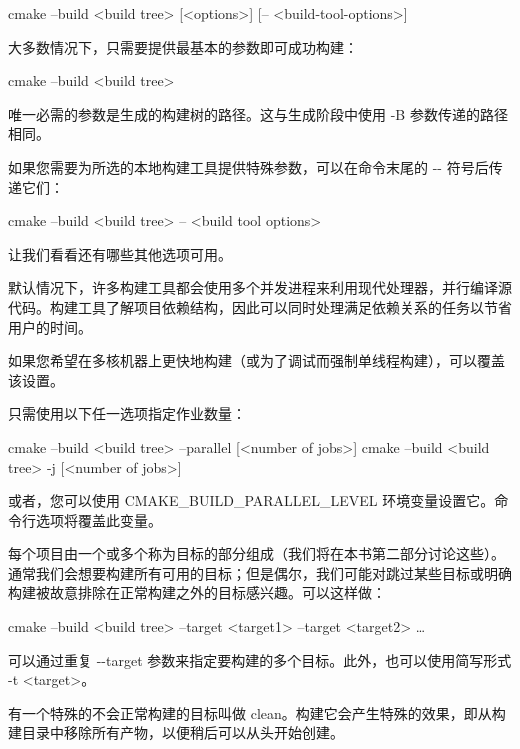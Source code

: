 \begin{shell}
cmake --build <build tree> [<options>] [-- <build-tool-options>]
\end{shell}

大多数情况下，只需要提供最基本的参数即可成功构建：

\begin{shell}
cmake --build <build tree>
\end{shell}

唯一必需的参数是生成的构建树的路径。这与生成阶段中使用 -B 参数传递的路径相同。

如果您需要为所选的本地构建工具提供特殊参数，可以在命令末尾的 -{}- 符号后传递它们：

\begin{shell}
cmake --build <build tree> -- <build tool options>
\end{shell}

让我们看看还有哪些其他选项可用。


默认情况下，许多构建工具都会使用多个并发进程来利用现代处理器，并行编译源代码。构建工具了解项目依赖结构，因此可以同时处理满足依赖关系的任务以节省用户的时间。

如果您希望在多核机器上更快地构建（或为了调试而强制单线程构建），可以覆盖该设置。

只需使用以下任一选项指定作业数量：

\begin{shell}
cmake --build <build tree> --parallel [<number of jobs>]
cmake --build <build tree> -j [<number of jobs>]
\end{shell}

或者，您可以使用 CMAKE\_BUILD\_PARALLEL\_LEVEL 环境变量设置它。命令行选项将覆盖此变量。


每个项目由一个或多个称为目标的部分组成（我们将在本书第二部分讨论这些）。通常我们会想要构建所有可用的目标；但是偶尔，我们可能对跳过某些目标或明确构建被故意排除在正常构建之外的目标感兴趣。可以这样做：

\begin{shell}
cmake --build <build tree> --target <target1> --target <target2> …
\end{shell}

可以通过重复 -{}-target 参数来指定要构建的多个目标。此外，也可以使用简写形式 -t <target>。


有一个特殊的不会正常构建的目标叫做 clean。构建它会产生特殊的效果，即从构建目录中移除所有产物，以便稍后可以从头开始创建。

